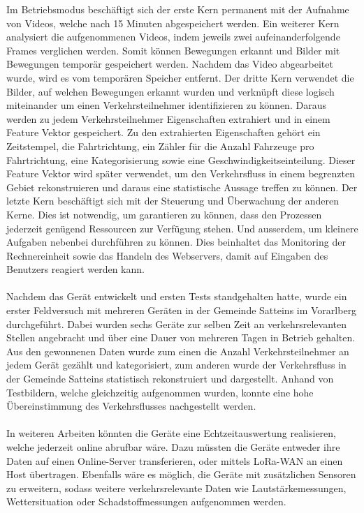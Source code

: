 Im Betriebsmodus beschäftigt sich der erste Kern permanent mit der Aufnahme von Videos, welche nach 15 Minuten abgespeichert werden. Ein weiterer Kern analysiert die aufgenommenen Videos, indem jeweils zwei aufeinanderfolgende Frames verglichen werden. Somit können Bewegungen erkannt und Bilder mit Bewegungen temporär gespeichert werden. Nachdem das Video abgearbeitet wurde, wird es vom temporären Speicher entfernt. Der dritte Kern verwendet die Bilder, auf welchen Bewegungen erkannt wurden und verknüpft diese logisch miteinander um einen Verkehrsteilnehmer identifizieren zu können. Daraus werden zu jedem Verkehrsteilnehmer Eigenschaften extrahiert und in einem Feature Vektor gespeichert. Zu den extrahierten Eigenschaften gehört ein Zeitstempel, die Fahrtrichtung, ein Zähler für die Anzahl Fahrzeuge pro Fahrtrichtung, eine Kategorisierung sowie eine Geschwindigkeitseinteilung. Dieser Feature Vektor wird später verwendet, um den Verkehrsfluss in einem begrenzten Gebiet rekonstruieren und daraus eine statistische Aussage treffen zu können. Der letzte Kern beschäftigt sich mit der Steuerung und Überwachung der anderen Kerne. Dies ist notwendig, um garantieren zu können, dass den Prozessen jederzeit genügend Ressourcen zur Verfügung stehen. Und ausserdem, um kleinere Aufgaben nebenbei durchführen zu können. Dies beinhaltet das Monitoring der Rechnereinheit sowie das Handeln des Webservers, damit auf Eingaben des Benutzers reagiert werden kann.\\\\
Nachdem das Gerät entwickelt und ersten Tests standgehalten hatte, wurde ein erster Feldversuch mit mehreren Geräten in der Gemeinde Satteins im Vorarlberg durchgeführt. Dabei wurden sechs Geräte zur selben Zeit an verkehrsrelevanten Stellen angebracht und über eine Dauer von mehreren Tagen in Betrieb gehalten. Aus den gewonnenen Daten wurde zum einen die Anzahl Verkehrsteilnehmer an jedem Gerät gezählt und kategorisiert, zum anderen wurde der Verkehrsfluss in der Gemeinde Satteins statistisch rekonstruiert und dargestellt. Anhand von Testbildern, welche gleichzeitig aufgenommen wurden, konnte eine hohe Übereinstimmung des Verkehrsflusses nachgestellt werden.\\\\
In weiteren Arbeiten könnten die Geräte eine Echtzeitauswertung realisieren, welche jederzeit online abrufbar wäre. Dazu müssten die Geräte entweder ihre Daten auf einen Online-Server transferieren, oder mittels LoRa-WAN an einen Host übertragen. Ebenfalls wäre es möglich, die Geräte mit zusätzlichen Sensoren zu erweitern, sodass weitere verkehrsrelevante Daten wie Lautstärkemessungen, Wettersituation oder Schadstoffmessungen aufgenommen werden.
\newpage
